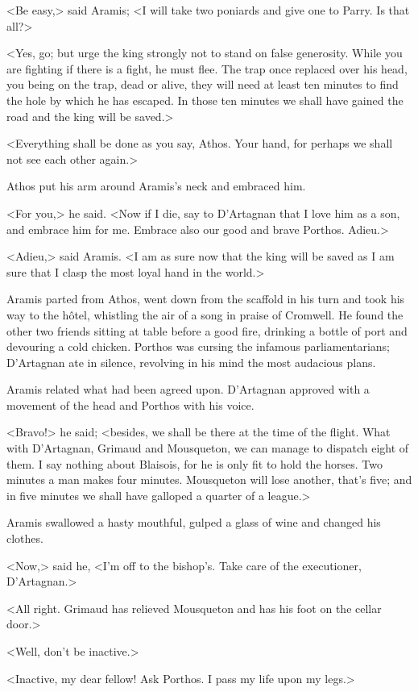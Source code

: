 <Be easy,> said Aramis; <I will take two poniards and give one to Parry. Is that all?>

<Yes, go; but urge the king strongly not to stand on false generosity. While you are fighting if there is a fight, he must flee. The trap once replaced over his head, you being on the trap, dead or alive, they will need at least ten minutes to find the hole by which he has escaped. In those ten minutes we shall have gained the road and the king will be saved.>

<Everything shall be done as you say, Athos. Your hand, for perhaps we shall not see each other again.>

Athos put his arm around Aramis's neck and embraced him.

<For you,> he said. <Now if I die, say to D'Artagnan that I love him as a son, and embrace him for me. Embrace also our good and brave Porthos. Adieu.>

<Adieu,> said Aramis. <I am as sure now that the king will be saved as I am sure that I clasp the most loyal hand in the world.>

Aramis parted from Athos, went down from the scaffold in his turn and took his way to the hôtel, whistling the air of a song in praise of Cromwell. He found the other two friends sitting at table before a good fire, drinking a bottle of port and devouring a cold chicken. Porthos was cursing the infamous parliamentarians; D'Artagnan ate in silence, revolving in his mind the most audacious plans.

Aramis related what had been agreed upon. D'Artagnan approved with a movement of the head and Porthos with his voice.

<Bravo!> he said; <besides, we shall be there at the time of the flight. What with D'Artagnan, Grimaud and Mousqueton, we can manage to dispatch eight of them. I say nothing about Blaisois, for he is only fit to hold the horses. Two minutes a man makes four minutes. Mousqueton will lose another, that's five; and in five minutes we shall have galloped a quarter of a league.>

Aramis swallowed a hasty mouthful, gulped a glass of wine and changed his clothes.

<Now,> said he, <I'm off to the bishop's. Take care of the executioner, D'Artagnan.>

<All right. Grimaud has relieved Mousqueton and has his foot on the cellar door.>

<Well, don't be inactive.>

<Inactive, my dear fellow! Ask Porthos. I pass my life upon my legs.>

